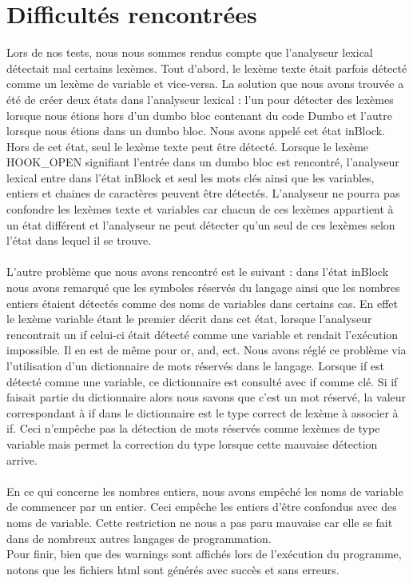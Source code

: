 \documentclass[a4paper,10pt]{article}
\begin{document}
\section{Difficultés rencontrées}

Lors de nos tests, nous nous sommes rendus compte que l'analyseur lexical détectait mal certains lexèmes. Tout d'abord, le lexème texte était parfois détecté comme un lexème de variable
et vice-versa. La solution que nous avons trouvée a été de créer deux états dans l'analyseur lexical : l'un pour détecter des lexèmes lorsque nous étions hors d'un dumbo bloc 
contenant du code Dumbo et l'autre lorsque nous étions dans un dumbo bloc. Nous avons appelé cet état inBlock. Hors de cet état, seul le lexème texte peut être détecté. 
Lorsque le lexème HOOK\_OPEN signifiant l'entrée dans un dumbo bloc est rencontré, l'analyseur lexical entre dans l'état inBlock et seul les mots clés ainsi que les variables, entiers et 
chaines de caractères peuvent être détectés. L'analyseur ne pourra pas confondre les lexèmes texte et variables car chacun de ces lexèmes appartient à un état différent et l'analyseur 
ne peut détecter qu'un seul de ces lexèmes selon l'état dans lequel il se trouve. \\ \\
L'autre problème que nous avons rencontré est le suivant : dans l'état inBlock nous avons remarqué que les symboles réservés du langage ainsi que les nombres entiers 
étaient détectés comme des noms de variables dans certains cas. En effet le lexème variable étant le premier décrit dans cet état, lorsque l'analyseur rencontrait un \textrm{if} celui-ci 
était détecté comme une variable et rendait l'exécution impossible. Il en est de même pour \textrm{or}, \textrm{and}, ect. Nous avons réglé ce problème via l'utilisation d'un dictionnaire
de mots réservés dans le langage. Lorsque \textrm{if} est détecté comme une variable, ce dictionnaire est consulté avec \textrm{if} comme clé. Si if faisait partie du dictionnaire 
alors nous savons que c'est un mot réservé, la valeur correspondant à \textrm{if} dans le dictionnaire est le type correct de lexème à associer à \textrm{if}. Ceci n'empêche pas la détection
de mots réservés comme lexèmes de type variable mais permet la correction du type lorsque cette mauvaise détection arrive.\\ \\
En ce qui concerne les nombres entiers, nous avons empêché les noms de variable de commencer par un entier. Ceci empêche les entiers d'être confondus avec des noms de variable. 
Cette restriction ne nous a pas paru mauvaise car elle se fait dans de nombreux autres langages de programmation.\\
Pour finir, bien que des warnings sont affichés lors de l'exécution du programme, notons que les fichiers html sont générés avec succès et sans erreurs.
\end{document}
